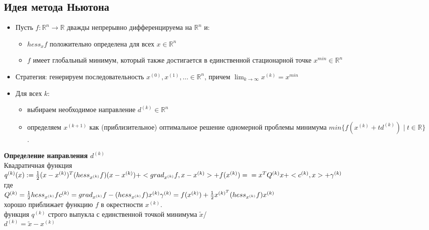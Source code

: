 \subsection{ Идея метода Ньютона}
\begin{itemize}
\item Пусть $f:\mathbb{R}^n \to \mathbb{R}$ дважды непрерывно дифференцируема на $\mathbb{R}^n$ и:
   \begin{itemize}
   \item $hess_xf$ положительно определена для всех $x \in \mathbb{R}^n$
   \item $f$ имеет глобальный минимум, который также достигается в единственной    стационарной точке $x^{min} \in \mathbb{R}^n$
   \end{itemize}
\item Стратегия: генерируем последовательность $x^{(0)}, x^{(1)}, \dots \in \mathbb{R}^n$, причем $\lim_{k \to \infty} x^{(k)}=x^{min}$
\item Для всех $k$:
   \begin{itemize}
   \item выбираем необходимое направление $d^{(k)} \in \mathbb{R}^n$
   \item определяем $ x^{(k+1)}$ как (приблизительное) оптимальное решение одномерной проблемы минимума $min \{f(x^{(k)}+td^{(k)}) \mid t \in \mathbb{R} \}$.
   \end{itemize}
\end{itemize}

{\bf Определение направления $d^{(k)}$}\\
\checkmark Квадратичная функция\\
$q^{(k)}(x):=\frac{1}{2} (x-x^{(k)})^T(hess_{x^{(k)}}f)(x-x^{(k)})+<grad_{x^{(k)}}f,x-x^{(k)}>
+f(x^{(k)})=\\=x^TQ^{(k)}x+<c^{(k)}, x>+\gamma^{(k)}$\\
где\\
$Q^{(k)}=\frac{1}{2} hess_{x^{(k)}}f\\
c^{(k)}=grad_{x^{(k)}}f-(hess_{x^{(k)}}f)x^{(k)}\\
\gamma^{(k)}=f(x^{(k)})+\frac{1}{2} x^{(k)^T}(hess_{x^{(k)}}f)x^{(k)}$\\
хорошо приближает функцию $f$ в окрестности $x^{(k)}$.\\
\checkmark функция $q^{(k)}$ строго выпукла с единственной точкой минимума $\tilde{x}$/\\

\checkmark $d^{(k)}=\tilde{x}-x^{(k)}$\\

